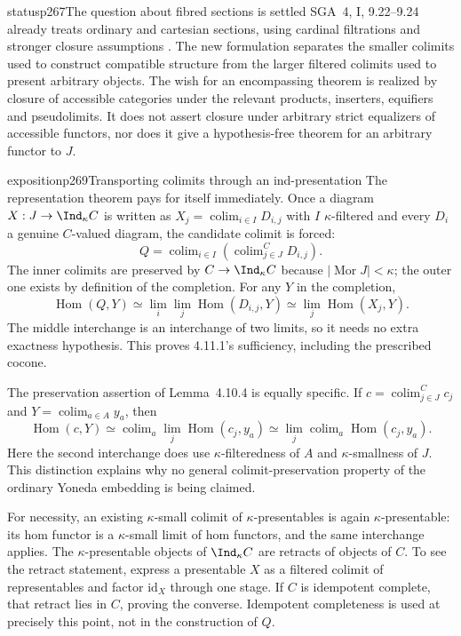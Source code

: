 \begin{dcomment}{status}{p267}{The question about fibred sections is settled}
SGA~4, I, 9.22--9.24 already treats ordinary and cartesian sections, using cardinal filtrations and stronger closure assumptions \citep{SGA4I1972}. The new formulation separates the smaller colimits used to construct compatible structure from the larger filtered colimits used to present arbitrary objects. The wish for an encompassing theorem is realized by closure of accessible categories under the relevant products, inserters, equifiers and pseudolimits. It does not assert closure under arbitrary strict equalizers of accessible functors, nor does it give a hypothesis-free theorem for an arbitrary functor to $J$.
\end{dcomment}

\begin{dcomment}{exposition}{p269}{Transporting colimits through an ind-presentation}
The representation theorem pays for itself immediately. Once a diagram $X:J\to\Ind_\kappa C$ is written as $X_j=\operatorname{colim}_{i\in I}D_{i,j}$ with $I$ $\kappa$-filtered and every $D_i$ a genuine $C$-valued diagram, the candidate colimit is forced:
\[
 Q=\operatorname{colim}_{i\in I}\left(\operatorname{colim}_{j\in J}^{C}D_{i,j}\right).
\]
The inner colimits are preserved by $C\to\Ind_\kappa C$ because $|\operatorname{Mor}J|<\kappa$; the outer one exists by definition of the completion. For any $Y$ in the completion,
\[
 \operatorname{Hom}(Q,Y)
 \simeq\lim_i\lim_j\operatorname{Hom}(D_{i,j},Y)
 \simeq\lim_j\operatorname{Hom}(X_j,Y).
\]
The middle interchange is an interchange of two limits, so it needs no extra exactness hypothesis. This proves 4.11.1's sufficiency, including the prescribed cocone.

The preservation assertion of Lemma~4.10.4 is equally specific. If $c=\operatorname{colim}_{j\in J}^{C}c_j$ and $Y=\operatorname{colim}_{a\in A}y_a$, then
\[
 \operatorname{Hom}(c,Y)
 \simeq\operatorname{colim}_a\lim_j\operatorname{Hom}(c_j,y_a)
 \simeq\lim_j\operatorname{colim}_a\operatorname{Hom}(c_j,y_a).
\]
Here the second interchange does use $\kappa$-filteredness of $A$ and $\kappa$-smallness of $J$. This distinction explains why no general colimit-preservation property of the ordinary Yoneda embedding is being claimed.

For necessity, an existing $\kappa$-small colimit of $\kappa$-presentables is again $\kappa$-presentable: its hom functor is a $\kappa$-small limit of hom functors, and the same interchange applies. The $\kappa$-presentable objects of $\Ind_\kappa C$ are retracts of objects of $C$. To see the retract statement, express a presentable $X$ as a filtered colimit of representables and factor $\mathrm{id}_X$ through one stage. If $C$ is idempotent complete, that retract lies in $C$, proving the converse. Idempotent completeness is used at precisely this point, not in the construction of $Q$.
\end{dcomment}

